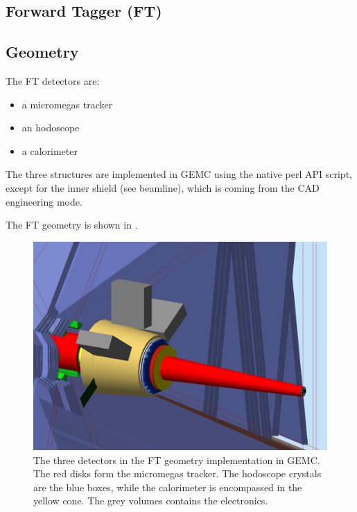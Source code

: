 \subsection{Forward Tagger (FT)}


\subsection{Geometry}

The FT detectors are:

\begin{itemize}
	\item a micromegas tracker
	\item an hodoscope
 	\item a calorimeter
\end{itemize}

The three structures are implemented in GEMC using the native perl API script, except for the inner shield (see beamline), which is coming from the CAD engineering mode.

The FT geometry is shown in .


\begin{figure}
	\centering
	\includegraphics[width=0.99\columnwidth,keepaspectratio]{img/ftGeometry.png}
	\caption{The three detectors in the FT geometry implementation in GEMC. The red disks form the micromegas tracker. The hodoscope crystals are the blue boxes,
            while the calorimeter is encompassed in the yellow cone. The grey volumes contains the electronics.}
	\label{fig:ftGeometry}
\end{figure}



